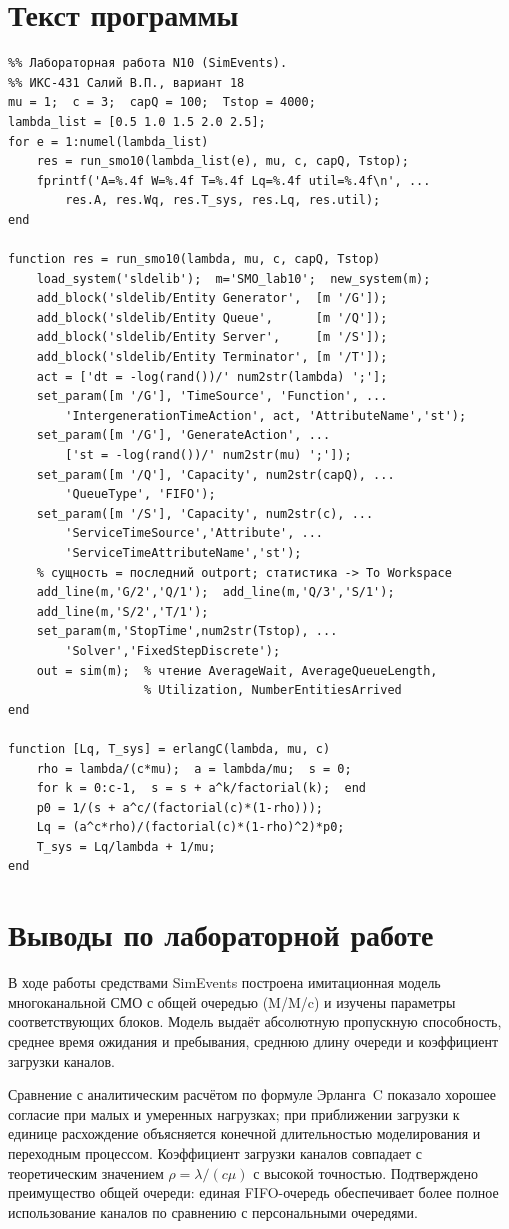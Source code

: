 \documentclass[a4paper,14pt,oneside,openany]{memoir}
\begin{document}
\section{Текст программы}
\begin{verbatim}
%% Лабораторная работа N10 (SimEvents).
%% ИКС-431 Салий В.П., вариант 18
mu = 1;  c = 3;  capQ = 100;  Tstop = 4000;
lambda_list = [0.5 1.0 1.5 2.0 2.5];
for e = 1:numel(lambda_list)
    res = run_smo10(lambda_list(e), mu, c, capQ, Tstop);
    fprintf('A=%.4f W=%.4f T=%.4f Lq=%.4f util=%.4f\n', ...
        res.A, res.Wq, res.T_sys, res.Lq, res.util);
end

function res = run_smo10(lambda, mu, c, capQ, Tstop)
    load_system('sldelib');  m='SMO_lab10';  new_system(m);
    add_block('sldelib/Entity Generator',  [m '/G']);
    add_block('sldelib/Entity Queue',      [m '/Q']);
    add_block('sldelib/Entity Server',     [m '/S']);
    add_block('sldelib/Entity Terminator', [m '/T']);
    act = ['dt = -log(rand())/' num2str(lambda) ';'];
    set_param([m '/G'], 'TimeSource', 'Function', ...
        'IntergenerationTimeAction', act, 'AttributeName','st');
    set_param([m '/G'], 'GenerateAction', ...
        ['st = -log(rand())/' num2str(mu) ';']);
    set_param([m '/Q'], 'Capacity', num2str(capQ), ...
        'QueueType', 'FIFO');
    set_param([m '/S'], 'Capacity', num2str(c), ...
        'ServiceTimeSource','Attribute', ...
        'ServiceTimeAttributeName','st');
    % сущность = последний outport; статистика -> To Workspace
    add_line(m,'G/2','Q/1');  add_line(m,'Q/3','S/1');
    add_line(m,'S/2','T/1');
    set_param(m,'StopTime',num2str(Tstop), ...
        'Solver','FixedStepDiscrete');
    out = sim(m);  % чтение AverageWait, AverageQueueLength,
                   % Utilization, NumberEntitiesArrived
end

function [Lq, T_sys] = erlangC(lambda, mu, c)
    rho = lambda/(c*mu);  a = lambda/mu;  s = 0;
    for k = 0:c-1,  s = s + a^k/factorial(k);  end
    p0 = 1/(s + a^c/(factorial(c)*(1-rho)));
    Lq = (a^c*rho)/(factorial(c)*(1-rho)^2)*p0;
    T_sys = Lq/lambda + 1/mu;
end
\end{verbatim}

\section*{Выводы по лабораторной работе}
В ходе работы средствами SimEvents построена имитационная модель многоканальной СМО с общей очередью (M/M/c) и изучены параметры соответствующих блоков. Модель выдаёт абсолютную пропускную способность, среднее время ожидания и пребывания, среднюю длину очереди и коэффициент загрузки каналов.

Сравнение с аналитическим расчётом по формуле Эрланга~C показало хорошее согласие при малых и умеренных нагрузках; при приближении загрузки к единице расхождение объясняется конечной длительностью моделирования и переходным процессом. Коэффициент загрузки каналов совпадает с теоретическим значением $\rho=\lambda/(c\mu)$ с высокой точностью. Подтверждено преимущество общей очереди: единая FIFO-очередь обеспечивает более полное использование каналов по сравнению с персональными очередями.
\end{document}
